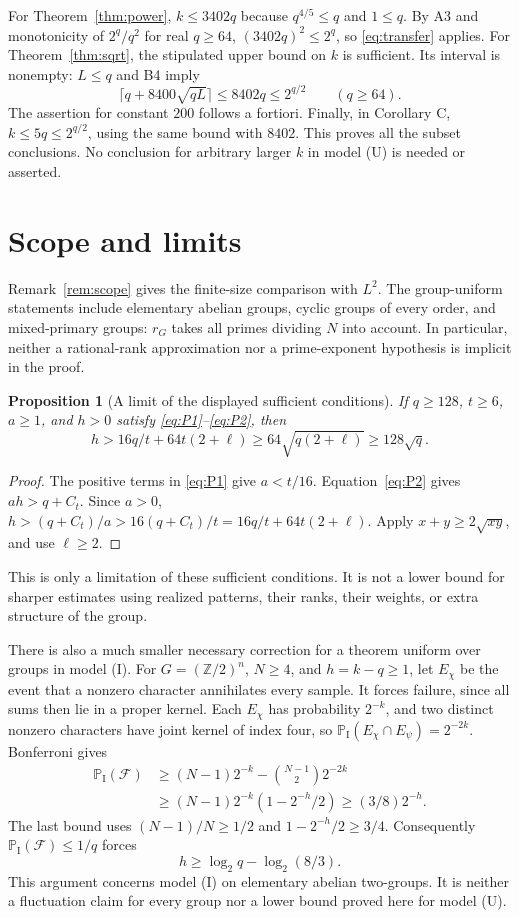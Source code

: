 \documentclass[11pt]{amsart}
\newtheorem*{proposition}{Proposition}
\theoremstyle{remark}
\newcommand{\Z}{\mathbb Z}
\newcommand{\PI}{\mathbb P_{\mathrm I}}
\newcommand{\Fail}{\mathcal F}
\begin{document}
For Theorem~\ref{thm:power}, $k\le3402q$ because $q^{4/5}\le q$
and $1\le q$. By A3 and monotonicity of $2^q/q^2$ for real
$q\ge64$, $(3402q)^2\le2^q$, so \eqref{eq:transfer} applies.
For Theorem~\ref{thm:sqrt}, the stipulated upper bound on $k$
is sufficient. Its interval is nonempty: $L\le q$ and B4 imply
\[
 \lceil q+8400\sqrt{qL}\rceil\le8402q\le2^{q/2}
 \qquad(q\ge64).
\]
The assertion for constant $200$ follows a fortiori. Finally, in
Corollary C, $k\le5q\le2^{q/2}$, using the same bound with $8402$.
This proves all the subset conclusions. No conclusion for arbitrary
larger $k$ in model \textup{(U)} is needed or asserted.

\section{Scope and limits}\label{sec:limits}
Remark~\ref{rem:scope} gives the finite-size comparison with $L^2$.
The group-uniform statements include elementary abelian groups, cyclic
groups of every order, and mixed-primary groups: $r_G$ takes all primes
dividing $N$ into account. In particular, neither a rational-rank
approximation nor a prime-exponent hypothesis is implicit in the proof.

\begin{proposition}[A limit of the displayed sufficient conditions]
If $q\ge128$, $t\ge6$, $a\ge1$, and $h>0$ satisfy
\eqref{eq:P1}--\eqref{eq:P2}, then
\begin{equation}\label{eq:barrier}
 h>16q/t+64t(2+\ell)
   \ge64\sqrt{q(2+\ell)}\ge128\sqrt q.
\end{equation}
\end{proposition}
\begin{proof}
The positive terms in \eqref{eq:P1} give $a<t/16$.
Equation~\eqref{eq:P2} gives $ah>q+C_t$. Since $a>0$,
$h>(q+C_t)/a>16(q+C_t)/t=16q/t+64t(2+\ell)$.
Apply $x+y\ge2\sqrt{xy}$, and use $\ell\ge2$.
\end{proof}
This is only a limitation of these sufficient conditions. It is not
a lower bound for sharper estimates using realized patterns, their
ranks, their weights, or extra structure of the group.

There is also a much smaller necessary correction for a theorem
uniform over groups in model \textup{(I)}. For $G=(\Z/2)^n$,
$N\ge4$, and $h=k-q\ge1$, let $E_\chi$ be the event that a nonzero
character annihilates every sample. It forces failure, since all sums
then lie in a proper kernel. Each $E_\chi$ has probability $2^{-k}$,
and two distinct nonzero characters have joint kernel of index four,
so $\PI(E_\chi\cap E_\psi)=2^{-2k}$. Bonferroni gives
\begin{align*}
 \PI(\Fail)&\ge(N-1)2^{-k}-\binom{N-1}{2}2^{-2k}\\
 &\ge(N-1)2^{-k}(1-2^{-h}/2)\ge(3/8)2^{-h}.
\end{align*}
The last bound uses $(N-1)/N\ge1/2$ and $1-2^{-h}/2\ge3/4$.
Consequently $\PI(\Fail)\le1/q$ forces
\[
 h\ge\log_2q-\log_2(8/3).
\]
This argument concerns model \textup{(I)} on elementary abelian
two-groups. It is neither a fluctuation claim for every group nor a
lower bound proved here for model \textup{(U)}.
\end{document}

